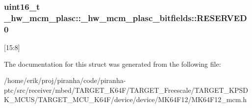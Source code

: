 \subsubsection[{\texorpdfstring{R\+E\+S\+E\+R\+V\+E\+D0}{RESERVED0}}]{\setlength{\rightskip}{0pt plus 5cm}uint16\+\_\+t \+\_\+hw\+\_\+mcm\+\_\+plasc\+::\+\_\+hw\+\_\+mcm\+\_\+plasc\+\_\+bitfields\+::\+R\+E\+S\+E\+R\+V\+E\+D0}\hypertarget{struct__hw__mcm__plasc_1_1__hw__mcm__plasc__bitfields_aa9ecfa1d14dcf667c400a19c4b6164bb}{}\label{struct__hw__mcm__plasc_1_1__hw__mcm__plasc__bitfields_aa9ecfa1d14dcf667c400a19c4b6164bb}
\mbox{[}15\+:8\mbox{]} 

The documentation for this struct was generated from the following file\+:\begin{DoxyCompactItemize}
\item 
/home/erik/proj/piranha/code/piranha-\/ptc/src/receiver/mbed/\+T\+A\+R\+G\+E\+T\+\_\+\+K64\+F/\+T\+A\+R\+G\+E\+T\+\_\+\+Freescale/\+T\+A\+R\+G\+E\+T\+\_\+\+K\+P\+S\+D\+K\+\_\+\+M\+C\+U\+S/\+T\+A\+R\+G\+E\+T\+\_\+\+M\+C\+U\+\_\+\+K64\+F/device/device/\+M\+K64\+F12/M\+K64\+F12\+\_\+mcm.\+h\end{DoxyCompactItemize}
